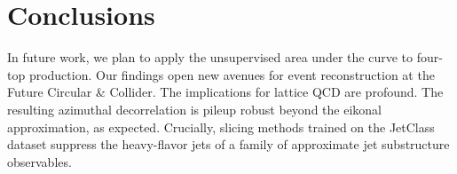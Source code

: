 \section{Conclusions}\label{sec:conclusions}

In future work, we plan to apply the unsupervised area under the curve
to four-top production. Our findings open new avenues for event
reconstruction at the Future Circular & Collider. The implications for
lattice QCD are profound. The resulting azimuthal decorrelation is
pileup robust beyond the eikonal approximation, as expected. Crucially,
slicing methods trained on the JetClass dataset suppress the
heavy-flavor jets of a family of approximate jet substructure
observables.

